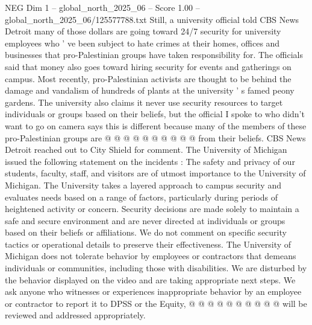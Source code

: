 \begin{textsample}{NEG Dim 1 – global\_north\_2025\_06 – Score 1.00 – global\_north\_2025\_06/125577788.txt}
Still, a university official told CBS News Detroit many of those dollars are going toward 24/7 security for university employees who ' ve been subject to hate crimes at their homes, offices and businesses that pro-Palestinian groups have taken responsibility for.
The officials said that money also goes toward hiring security for events and gatherings on campus.
Most recently, pro-Palestinian activists are thought to be behind the damage and vandalism of hundreds of plants at the university ' s famed peony gardens.
The university also claims it never use security resources to target individuals or groups based on their beliefs, but the official I spoke to who didn't want to go on camera says this is different because many of the members of these pro-Palestinian groups are @ @ @ @ @ @ @ @ @ @ from their beliefs.
CBS News Detroit reached out to City Shield for comment.
The University of Michigan issued the following statement on the incidents : The safety and privacy of our students, faculty, staff, and visitors are of utmost importance to the University of Michigan.
The University takes a layered approach to campus security and evaluates needs based on a range of factors, particularly during periods of heightened activity or concern.
Security decisions are made solely to maintain a safe and secure environment and are never directed at individuals or groups based on their beliefs or affiliations.
We do not comment on specific security tactics or operational details to preserve their effectiveness.
The University of Michigan does not tolerate behavior by employees or contractors that demeans individuals or communities, including those with disabilities.
We are disturbed by the behavior displayed on the video and are taking appropriate next steps.
We ask anyone who witnesses or experiences inappropriate behavior by an employee or contractor to report it to DPSS or the Equity, @ @ @ @ @ @ @ @ @ @ will be reviewed and addressed appropriately.

\end{textsample}
